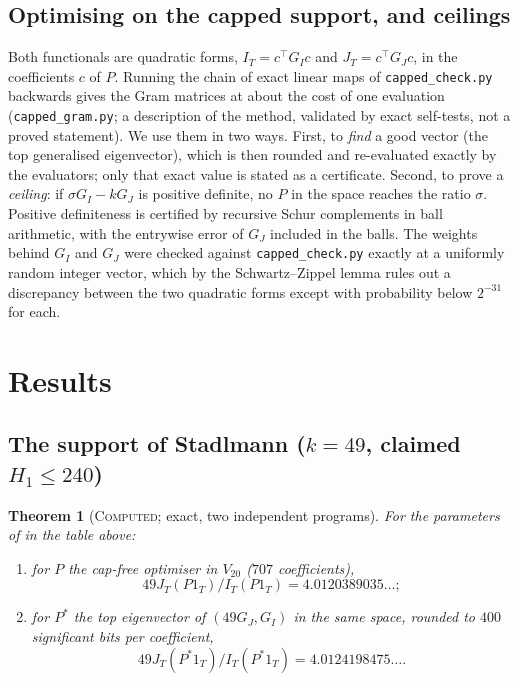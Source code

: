 \documentclass[11pt]{amsart}
\newtheorem{theorem}{Theorem}
\theoremstyle{definition}
\theoremstyle{remark}
\newcommand{\lbl}[1]{\textup{\textsc{#1}}}
\begin{document}
\subsection*{Optimising on the capped support, and ceilings}
Both functionals are quadratic forms, $I_T=c^\top G_Ic$ and $J_T=c^\top G_Jc$,
in the coefficients $c$ of $P$. Running the chain of exact linear maps of
\texttt{capped\_check.py} backwards gives the Gram matrices at about the cost
of one evaluation (\texttt{capped\_gram.py}; a description of the method,
validated by exact self-tests, not a proved statement).
We use them in two ways. First, to \emph{find} a good vector (the top
generalised eigenvector), which is then rounded and re-evaluated exactly by
the evaluators; only that exact value is stated as a certificate. Second, to
prove a \emph{ceiling}: if $\sigma G_I-kG_J$ is positive definite, no $P$ in
the space reaches the ratio $\sigma$. Positive definiteness is certified by
recursive Schur complements in ball arithmetic, with the entrywise error of
$G_J$ included in the balls. The weights behind $G_I$ and $G_J$ were checked
against \texttt{capped\_check.py} exactly at a uniformly random integer
vector, which by the Schwartz--Zippel lemma rules out a discrepancy between
the two quadratic forms except with probability below $2^{-31}$ for each.

\section{Results}

\subsection*{The support of Stadlmann ($k=49$, claimed $H_1\le240$)}

\begin{theorem}[\lbl{Computed}; exact, two independent programs]\label{thm:240}
For the parameters of \cite{Sta26} in the table above:
\begin{enumerate}
\item for $P$ the cap-free optimiser in $V_{20}$ ($707$ coefficients),
\[49J_T(P1_T)/I_T(P1_T)=4.0120389035\ldots;\]
\item for $P^\ast$ the top eigenvector of $(49G_J,G_I)$ in the same space,
rounded to $400$ significant bits per coefficient,
\[49J_T(P^\ast1_T)/I_T(P^\ast1_T)=4.0124198475\ldots.\]
\end{enumerate}
\end{theorem}
\end{document}

